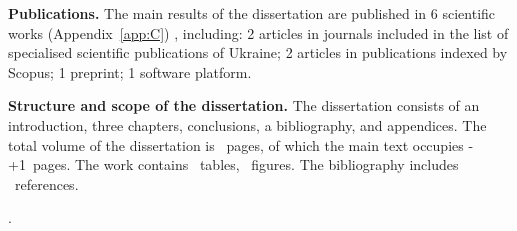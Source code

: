 {\textbf{Publications.} The main results of the dissertation are published in 6 scientific works (Appendix~\ref{app:C}) \cite{Titova2025cte, Korniienko2025mrqs, Korniienko2025cte, Korniienko2025aredu, KorniienkoSemerikov2024, Korniienko2024hlg}, including: 2 articles in journals included in the list of specialised scientific publications of Ukraine; 2 articles in publications indexed by Scopus; 1 preprint; 1 software platform.

\textbf{Structure and scope of the dissertation.}
The dissertation consists of an introduction, three chapters, conclusions, a bibliography, and appendices. The total volume of the dissertation is \pageref{last_page}~pages, of which the main text occupies \the\numexpr{}-+1\relax~pages. The work contains \totaltables~tables, \totalfigures~figures. The bibliography includes ~references.

.
}
